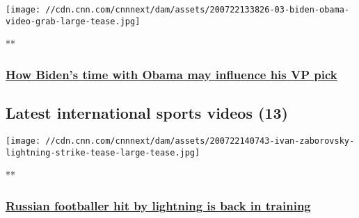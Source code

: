 \href{/videos/politics/2020/08/07/biden-obama-relationship-examined-vp-pick-zeleny-pkg-lead-vpx.cnn/video/playlists/this-week-in-politics/}{}

\texttt{[image: //cdn.cnn.com/cnnnext/dam/assets/200722133826-03-biden-obama-video-grab-large-tease.jpg]}

**

\hypertarget{how-bidens-time-with-obama-may-influence-his-vp-pick}{%
\subsubsection{\texorpdfstring{\href{/videos/politics/2020/08/07/biden-obama-relationship-examined-vp-pick-zeleny-pkg-lead-vpx.cnn/video/playlists/this-week-in-politics/}{How
Biden's time with Obama may influence his VP
pick}}{How Biden's time with Obama may influence his VP pick}}\label{how-bidens-time-with-obama-may-influence-his-vp-pick}}

\hypertarget{latest-international-sports-videos-13}{%
\subsection{Latest international sports videos
(13)}\label{latest-international-sports-videos-13}}

\href{/videos/sports/2020/07/22/ivan-zaborovsky-lightning-strike-recovery-znamya-truda-russia-football-spt-intl-lon-orig.cnn/video/playlists/international-sport-playlist-general-videos/}{}

\texttt{[image: //cdn.cnn.com/cnnnext/dam/assets/200722140743-ivan-zaborovsky-lightning-strike-tease-large-tease.jpg]}

**

\hypertarget{russian-footballer-hit-by-lightning-is-back-in-training}{%
\subsubsection{\texorpdfstring{\href{/videos/sports/2020/07/22/ivan-zaborovsky-lightning-strike-recovery-znamya-truda-russia-football-spt-intl-lon-orig.cnn/video/playlists/international-sport-playlist-general-videos/}{Russian
footballer hit by lightning is back in
training}}{Russian footballer hit by lightning is back in training}}\label{russian-footballer-hit-by-lightning-is-back-in-training}}

\href{/videos/sports/2020/07/29/cesc-fabregas-time-out-football-racism-coronavirus-arsenal-chelsea-spt-intl-orig-lon.cnn/video/playlists/international-sport-playlist-general-videos/}{}

